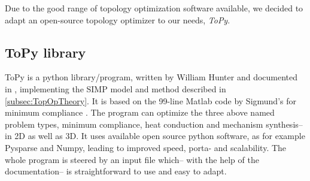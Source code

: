 Due to the good range of topology optimization software available, we decided to adapt an open-source topology optimizer to our needs, \emph{ToPy}.

\subsection{ToPy library}\label{sec:ToPy}
ToPy \cite{ToPy} is a python library/program, written by William Hunter and documented in \cite{Hunter2009}, implementing the SIMP model and method described in \autoref{subsec:TopOpTheory}. It is based on the 99-line Matlab code by Sigmund's for minimum compliance \cite{sigmund200199}. The program can optimize the three above named problem types, minimum compliance, heat conduction and mechanism synthesis-- in 2D as well as 3D. It uses available open source python software, as for example Pysparse and Numpy, leading to improved speed, porta- and scalability. The whole program is steered by an input file which-- with the help of the documentation-- is straightforward to use and easy to adapt. 

